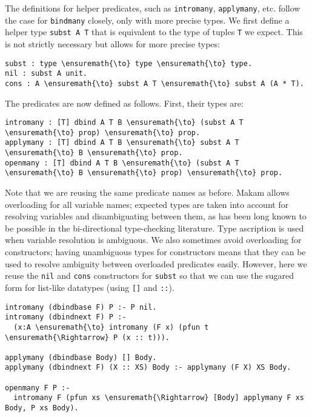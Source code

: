 The definitions for helper predicates, such as \texttt{intromany},
\texttt{applymany}, etc. follow the case for \texttt{bindmany} closely,
only with more precise types. We first define a helper type
\texttt{subst\ A\ T} that is equivalent to the type of tuples \texttt{T}
we expect. This is not strictly necessary but allows for more precise
types:

\begin{verbatim}
subst : type \ensuremath{\to} type \ensuremath{\to} type.
nil : subst A unit.
cons : A \ensuremath{\to} subst A T \ensuremath{\to} subst A (A * T).
\end{verbatim}

The predicates are now defined as follows. First, their types are:

\begin{verbatim}
intromany : [T] dbind A T B \ensuremath{\to} (subst A T \ensuremath{\to} prop) \ensuremath{\to} prop.
applymany : [T] dbind A T B \ensuremath{\to} subst A T \ensuremath{\to} B \ensuremath{\to} prop.
openmany : [T] dbind A T B \ensuremath{\to} (subst A T \ensuremath{\to} B \ensuremath{\to} prop) \ensuremath{\to} prop.
\end{verbatim}

Note that we are reusing the same predicate names as before. Makam
allows overloading for all variable names; expected types are taken into
account for resolving variables and disambiguating between them, as has
been long known to be possible in the bi-directional type-checking
literature. Type ascription is used when variable resolution is
ambiguous. We also sometimes avoid overloading for constructors; having
unambiguous types for constructors means that they can be used to
resolve ambiguity between overloaded predicates easily. However, here we
reuse the \texttt{nil} and \texttt{cons} constructors for \texttt{subst}
so that we can use the sugared form for list-like datatypes (using
\texttt{{[}{]}} and \texttt{::}).

\begin{verbatim}
intromany (dbindbase F) P :- P nil.
intromany (dbindnext F) P :-
  (x:A \ensuremath{\to} intromany (F x) (pfun t \ensuremath{\Rightarrow} P (x :: t))).

applymany (dbindbase Body) [] Body.
applymany (dbindnext F) (X :: XS) Body :- applymany (F X) XS Body.

openmany F P :-
  intromany F (pfun xs \ensuremath{\Rightarrow} [Body] applymany F xs Body, P xs Body).
\end{verbatim}

